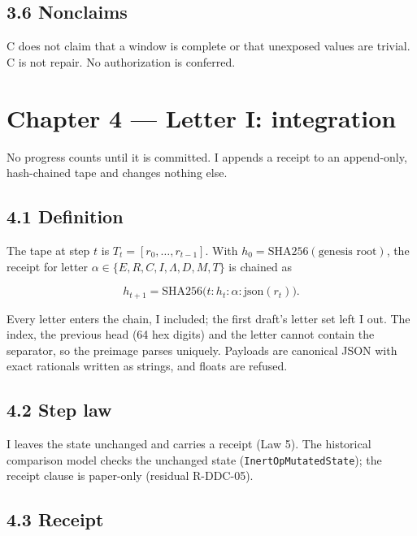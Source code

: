 \documentclass[
  11pt,
]{article}
\newenvironment{Shaded}{}{}
\newcommand{\NormalTok}[1]{#1}
\renewcommand{\_}{\ddcunderscore\allowbreak}
\begin{document}
\subsection{3.6 Nonclaims}\label{nonclaims-2}

\begin{Shaded}
\begin{Highlighting}[]
\NormalTok{C does not claim that a window is complete or that unexposed values are trivial.}
\NormalTok{C is not repair. No authorization is conferred.}
\end{Highlighting}
\end{Shaded}

\section{Chapter 4 --- Letter I: integration}\label{chapter-4}

No progress counts until it is committed. I appends a receipt to an
append-only, hash-chained tape and changes nothing else.

\subsection{4.1 Definition}\label{definition-4}

The tape at step \(t\) is \(T_t = [r_0, \dots, r_{t-1}]\). With
\(h_0 = \mathrm{SHA256}(\text{genesis root})\), the receipt for letter
\(\alpha \in \{E, R, C, I, \Lambda, D, M, T\}\) is chained as

\[h_{t+1} = \mathrm{SHA256}\big(t : h_t : \alpha : \mathrm{json}(r_t)\big).\]

Every letter enters the chain, I included; the first draft's letter set
left I out. The index, the previous head (64 hex digits) and the letter
cannot contain the separator, so the preimage parses uniquely. Payloads
are canonical JSON with exact rationals written as strings, and floats
are refused.

\subsection{4.2 Step law}\label{step-law-3}

I leaves the state unchanged and carries a receipt (Law 5). The
historical comparison model checks the unchanged state
(\texttt{Inert\allowbreak Op\allowbreak Mutated\allowbreak State}); the receipt clause is paper-only
(residual R-DDC-05).

\subsection{4.3 Receipt}\label{receipt-3}
\end{document}
